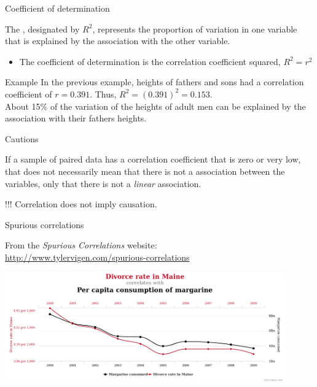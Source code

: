 \documentclass[xcolor=table, handout]{beamer}
\begin{document}
\begin{frame}{Coefficient of determination}
\begin{block}{}
\large
The , designated by $R^2$, represents the proportion of variation in one variable that is explained by the association with the other variable.
\begin{itemize}
\item The coefficient of determination is the correlation coefficient squared,  $R^2 = r^2$
\end{itemize}
\end{block}

\pause
\begin{exampleblock}{Example}
\large
In the previous example, heights of fathers and sons had a correlation coefficient of $r=0.391$. Thus, $R^2 = (0.391)^2 = 0.153$.\\
\medskip
About 15\% of the variation of the heights of adult men can be explained by the association with their fathers heights.
\end{exampleblock}
\end{frame}

\begin{frame}{Cautions}
\begin{block}{}
\large
If a sample of paired data has a correlation coefficient that is zero or very low, that does not necessarily mean that there is not a association between the variables, only that there is not a \emph{linear} association. 
\end{block}

\pause
\begin{alertblock}{!!!}
\Large
Correlation does not imply causation.
\end{alertblock}
\end{frame}

\begin{frame}{Spurious correlations}
\begin{block}{}
From the \emph{Spurious Correlations} website:\\ \url{http://www.tylervigen.com/spurious-correlations}
\end{block}
\bigskip
{\centering
\includegraphics[width=4.75in]{../images/ch10_cor_spur}
\par}

\end{frame}
\end{document}
